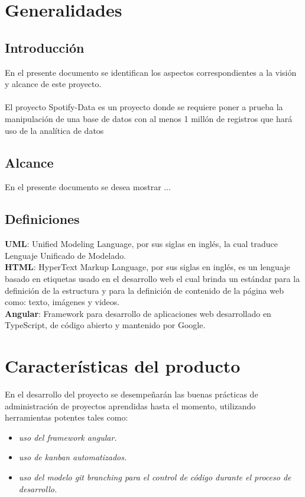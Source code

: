 \documentclass[12pt,a4paper]{article}
\date{\today}
\begin{document}
 	
\newpage
\section{Generalidades}
\subsection{Introducción}
En el presente documento se identifican los aspectos correspondientes a la visión y alcance de este proyecto.\\
\\ El proyecto Spotify-Data es un proyecto donde se requiere poner a prueba la manipulación
de una base de datos con al menos 1 millón de registros que hará uso de la analítica de datos
		
\subsection{Alcance}
En el presente documento se desea mostrar ...
\subsection{Definiciones}
\textbf {UML}: Unified Modeling Language, por sus siglas en inglés, la cual traduce
Lenguaje Unificado de Modelado.\\

\textbf {HTML}: HyperText Markup Language, por sus siglas en inglés, es un lenguaje
basado en etiquetas usado en el desarrollo web el cual brinda un estándar para
la definición de la estructura y para la definición de contenido de la página web
como: texto, imágenes y videos.\\

\textbf {Angular}: Framework para desarrollo de aplicaciones web desarrollado en TypeScript, de código abierto y mantenido por Google.\\

\section{Características del producto}
En el desarrollo del proyecto se desempeñarán las buenas prácticas de administración de proyectos aprendidas hasta el momento, utilizando herramientas potentes tales como:
\begin{itemize}
\item \textit{uso del framework angular.}
\item \textit{uso de kanban automatizados.}
\item \textit{uso del modelo git branching para el control de código durante el proceso de desarrollo.}
\end{itemize}
\end{document}
